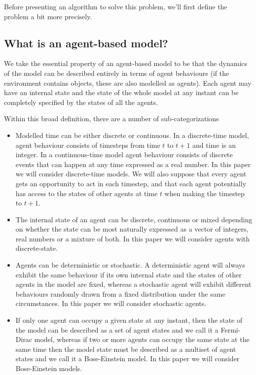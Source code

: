 \documentclass{article}
\begin{document}
Before presenting an algorithm to solve this problem, we'll first define the problem a bit more precisely.

\subsection{What is an agent-based model?}

We take the essential property of an agent-based model to be that the dynamics of the model can be described entirely in terms of agent behaviours (if the environment contains objects, these are also modelled as agents). Each agent may have an internal state and the state of the whole model at any instant can be completely specified by the states of all the agents.

Within this broad definition, there are a number of sub-categorizations
\begin{itemize}

\item Modelled time can be either discrete or continuous. In a discrete-time model, agent behaviour consists of timesteps from time $t$ to $t+1$ and time is an integer. In a continuous-time model agent behaviour consists of discrete events that can happen at any time expressed as a real number. In this paper we will consider discrete-time models. We will also suppose that every agent gets an opportunity to act in each timestep, and that each agent potentially has access to the states of other agents at time $t$ when making the timestep to $t+1$.

\item The internal state of an agent can be discrete, continuous or mixed depending on whether the state can be most naturally expressed as a vector of integers, real numbers or a mixture of both. In this paper we will consider agents with discrete-state. 

\item Agents can be deterministic or stochastic. A deterministic agent will always exhibit the same behaviour if its own internal state and the states of other agents in the model are fixed, whereas a stochastic agent will exhibit different behaviours randomly drawn from a fixed distribution under the same circumstances. In this paper we will consider stochastic agents.

\item If only one agent can occupy a given state at any instant, then the state of the model can be described as a set of agent states and we call it a Fermi-Dirac model, whereas if two or more agents can occupy the same state at the same time then the model state must be described as a multiset\cite{blizard1988multiset} of agent states and we call it a Bose-Einstein model. In this paper we will consider Bose-Einstein models.

\end{itemize}
\end{document}
